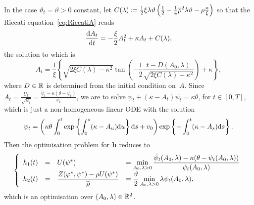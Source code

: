 \begin{example}\label{ex:HestonSmallNoiseLDP}
In the case $\vartheta_t=\vartheta>0$ constant, 
let $C(\lambda)\coloneqq \frac12\xi\lambda\vartheta\left(\frac12-\frac14\overline{\rho}^2\lambda\vartheta-\rho\frac\kappa\xi\right)$ so that the Riccati equation~\eqref{eq:RiccatiA} reads
\[
\frac{\mathrm{d} A_t}{\mathrm{d} t} = -\frac\xi 2 A^2_t + \kappa A_t + C(\lambda),
\]
the solution to which is
$$
A_t = \frac1\xi\left\{\sqrt{2\xi C(\lambda)-\kappa^2}\tan\left(-\frac12\frac{t-D(A_0, \lambda)}{\sqrt{2\xi C(\lambda)-\kappa^2}}\right)+\kappa\right\},
$$
where $D\in\mathbb{R}$ is determined from the initial condition on~$A$. 
Since $A_t=\tfrac{U_t}{\sqrt{\psi_t}}=\tfrac{\dot\psi_t-\kappa(\theta-\psi_t)}{\psi_t}$, we are to solve
$\dot\psi_t + (\kappa - A_t)\psi_t = \kappa\theta$,
for $t \in[0,T]$,
which is just a non-homogeneous linear ODE with the solution
$$
\psi_t = \left(\kappa\theta\int_0^t 
\exp\left\{\int_0^s (\kappa-A_u)\mathrm{d} u\right\}\mathrm{d} s + v_0\right)
\exp\left\{-\int_0^t (\kappa-A_s)\mathrm{d} s\right\}.
$$
Then the optimisation problem for $\boldsymbol{\mathrm{h}}$ reduces to
\begin{equation*}
\left\{
\begin{array}{rcll}
h_1(t)
 & = & \displaystyle U(\psi^{*})
 & = \displaystyle \min_{A_0, \lambda>0} \frac{\dot \psi_t(A_0, \lambda)-\kappa(\theta-\psi_t(A_0, \lambda))}{\psi_t(A_0, \lambda)} \\
h_2(t)
& = & \displaystyle \frac{Z(\varphi^{*}, \psi^{*})-\rho U(\psi^{*})}{\overline{\rho}}
& = \displaystyle \frac{\vartheta}{2}\min_{A_0, \lambda>0} \lambda\psi_t(A_0, \lambda),
\end{array}
\right.
\end{equation*}
which is an optimisation over $(A_0,\lambda)\in \mathbb{R}^2$.
\end{example}

